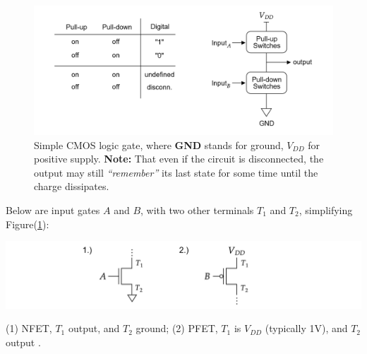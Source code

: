 \vspace{-1em}
\begin{figure}[ht!]
  \centering
  \includegraphics[width=\textwidth]{Sections/circuits/pun_pdn.png}
  \caption{Simple CMOS logic gate, where \textbf{GND} stands for ground, \textbf{$V_{DD}$} for positive supply.
  \textbf{Note:} That even if the circuit is disconnected, the output may still \emph{``remember''} its last state for some 
  time until the charge dissipates.}
  \label{fig:cmos-logic-gate}
\end{figure}

\begin{Def}

  \noindent
  Below are input gates $A$ and $B$, with two other terminals $T_1$ and $T_2$, simplifying Figure(\ref{fig:cmos-logic-gate}):

  \begin{center}
    
    \includegraphics[width=\textwidth]{Sections/circuits/np_simp.png}
  \end{center}
  
  \noindent
  (1) NFET, $T_1$ output, and $T_2$ ground; (2) PFET, $T_1$ is $V_{DD}$ (typically 1V), and $T_2$ output \cite{youtube:1rZyGL1K5QI}.

\end{Def}

\newpage

